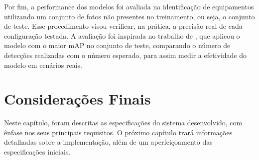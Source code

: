 Por fim, a performance dos modelos foi avaliada na identificação de equipamentos utilizando um conjunto de fotos não presentes no treinamento, ou seja, o conjunto de teste. Esse procedimento visou verificar, na prática, a precisão real de cada configuração testada. A avaliação foi inspirada no trabalho de \cite{gonzaga2023identificaccao}, que aplicou o modelo com o maior mAP no conjunto de teste, comparando o número de detecções realizadas com o número esperado, para assim medir a efetividade do modelo em cenários reais.

\section{Considerações Finais}

Neste capítulo, foram descritas as especificações do sistema desenvolvido, com ênfase nos seus principais requisitos. O próximo capítulo trará informações detalhadas sobre a implementação, além de um aperfeiçoamento das especificações iniciais.




